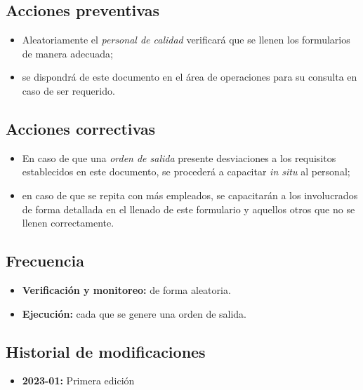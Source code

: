 \subsection{Acciones preventivas}

\begin{itemize}
	\item Aleatoriamente el \emph{personal de calidad} verificará que se llenen los formularios de manera adecuada;
	\item se dispondrá de este documento en el área de operaciones para su consulta en caso de ser requerido.
\end{itemize}

\subsection{Acciones correctivas}

\begin{itemize}
	\item En caso de que una \emph{orden de salida} presente desviaciones a los requisitos establecidos en este documento, se procederá a capacitar \emph{in situ} al personal;
	\item en caso de que se repita con más empleados, se capacitarán a los involucrados de forma detallada en el llenado de este formulario y aquellos otros que no se llenen correctamente.
\end{itemize}

\subsection{Frecuencia}

\begin{itemize}
	\item \textbf{Verificación y monitoreo:} de forma aleatoria.
	\item \textbf{Ejecución:} cada que se genere una orden de salida.
\end{itemize}

\subsection{Historial de modificaciones}

\begin{itemize}
	\item \textbf{2023-01:} Primera edición
\end{itemize}


